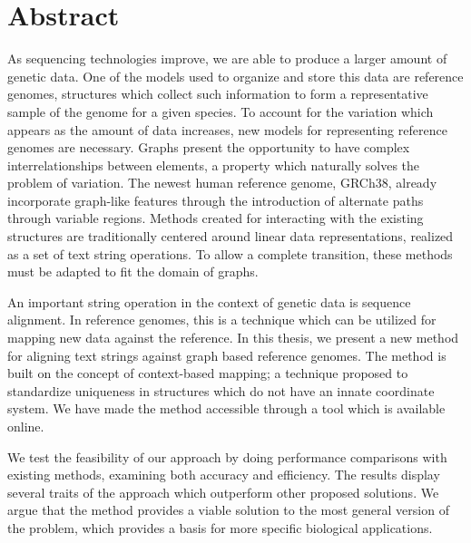 \documentclass[thesis.tex]{subfiles}
\begin{document}
\chapter*{Abstract}
As sequencing technologies improve, we are able to produce a larger amount of genetic data. One of the models used to organize and store this data are reference genomes, structures which collect such information to form a representative sample of the genome for a given species. To account for the variation which appears as the amount of data increases, new models for representing reference genomes are necessary. Graphs present the opportunity to have complex interrelationships between elements, a property which naturally solves the problem of variation. The newest human reference genome, GRCh38, already incorporate graph-like features through the introduction of alternate paths through variable regions. Methods created for interacting with the existing structures are traditionally centered around linear data representations, realized as a set of text string operations. To allow a complete transition, these methods must be adapted to fit the domain of graphs. \\
\par\noindent
An important string operation in the context of genetic data is sequence alignment. In reference genomes, this is a technique which can be utilized for mapping new data against the reference. In this thesis, we present a new method for aligning text strings against graph based reference genomes. The method is built on the concept of context-based mapping; a technique proposed to standardize uniqueness in structures which do not have an innate coordinate system. We have made the method accessible through a tool which is available online.\\
\par\noindent
We test the feasibility of our approach by doing performance comparisons with existing methods, examining both accuracy and efficiency. The results display several traits of the approach which outperform other proposed solutions. We argue that the method provides a viable solution to the most general version of the problem, which provides a basis for more specific biological applications.\\
\end{document}
